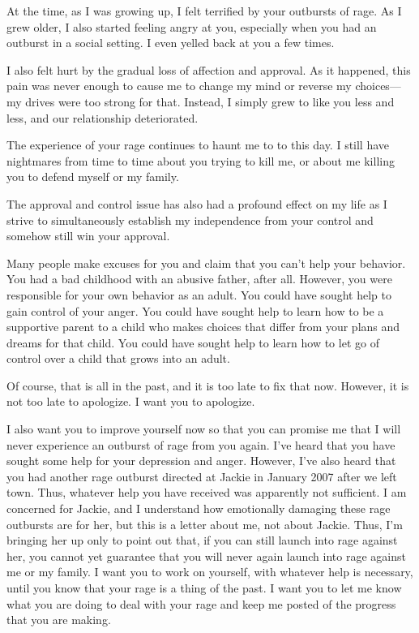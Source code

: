 \documentclass[12pt]{letter}
\begin{document}
\begin{letter}{}
\vspace{.25in}

At the time, as I was growing up, I felt terrified by your outbursts of rage.  As I grew older, I also started feeling angry at you, especially when you had an outburst in a social setting.  I even yelled back at you a few times.

I also felt hurt by the gradual loss of affection and approval.  As it happened, this pain was never enough to cause me to change my mind or reverse my choices---my drives were too strong for that.  Instead, I simply grew to like you less and less, and our relationship deteriorated.

\vspace{.25in}

The experience of your rage continues to haunt me to to this day.  I still have nightmares from time to time about you trying to kill me, or about me killing you to defend myself or my family.

The approval and control issue has also had a profound effect on my life as I strive to simultaneously establish my independence from your control and somehow still win your approval.

\vspace{.25in}

Many people make excuses for you and claim that you can't help your behavior.  You had a bad childhood with an abusive father, after all.  However, you were responsible for your own behavior as an adult.  You could have sought help to gain control of your anger.  You could have sought help to learn how to be a supportive parent to a child who makes choices that differ from your plans and dreams for that child.  You could have sought help to learn how to let go of control over a child that grows into an adult.

Of course, that is all in the past, and it is too late to fix that now.  However, it is not too late to apologize.  I want you to apologize.

I also want you to improve yourself now so that you can promise me that I will never experience an outburst of rage from you again.  I've heard that you have sought some help for your depression and anger.  However, I've also heard that you had another rage outburst directed at Jackie in January 2007 after we left town.  Thus, whatever help you have received was apparently not sufficient.  I am concerned for Jackie, and I understand how emotionally damaging these rage outbursts are for her, but this is a letter about me, not about Jackie.  Thus, I'm bringing her up only to point out that, if you can still launch into rage against her, you cannot yet guarantee that you will never again launch into rage against me or my family.  I want you to work on yourself, with whatever help is necessary, until you know that your rage is a thing of the past.  I want you to let me know what you are doing to deal with your rage and keep me posted of the progress that you are making.


\end{letter}
\end{document}

